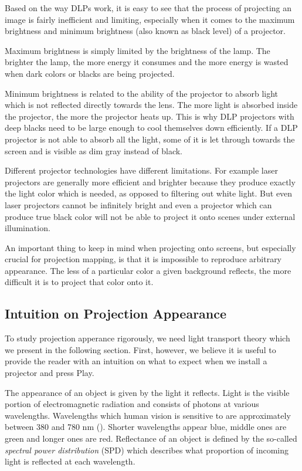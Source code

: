 Based on the way DLPs work, it is easy to see that the process of projecting an image is fairly inefficient and limiting, especially when it comes to the maximum brightness and minimum brightness (also known as black level) of a projector.

Maximum brightness is simply limited by the brightness of the lamp. The brighter the lamp, the more energy it consumes and the more energy is wasted when dark colors or blacks are being projected.

Minimum brightness is related to the ability of the projector to absorb light which is not reflected directly towards the lens. The more light is absorbed inside the projector, the more the projector heats up. This is why DLP projectors with deep blacks need to be large enough to cool themselves down efficiently. If a DLP projector is not able to absorb all the light, some of it is let through towards the screen and is visible as dim gray instead of black.

Different projector technologies have different limitations. For example laser projectors are generally more efficient and brighter because they produce exactly the light color which is needed, as opposed to filtering out white light. But even laser projectors cannot be infinitely bright and even a projector which can produce true black color will not be able to project it onto scenes under external illumination.

An important thing to keep in mind when projecting onto screens, but especially crucial for projection mapping, is that it is impossible to reproduce arbitrary appearance. The less of a particular color a given background reflects, the more difficult it is to project that color onto it.

\subsection{Intuition on Projection Appearance}
\label{section:background-projection_mapping-projection_intuition}

To study projection apperance rigorously, we need light transport theory which we present in the following section. First, however, we believe it is useful to provide the reader with an intuition on what to expect when we install a projector and press Play.

The appearance of an object is given by the light it reflects. Light is the visible portion of electromagnetic radiation and consists of photons at various wavelengths. Wavelengths which human vision is sensitive to are approximately between 380 and 780 nm (\citet{PBRT3e}). Shorter wavelengths appear blue, middle ones are green and longer ones are red. Reflectance of an object is defined by the so-called \textit{spectral power distribution} (SPD) which describes what proportion of incoming light is reflected at each wavelength.

